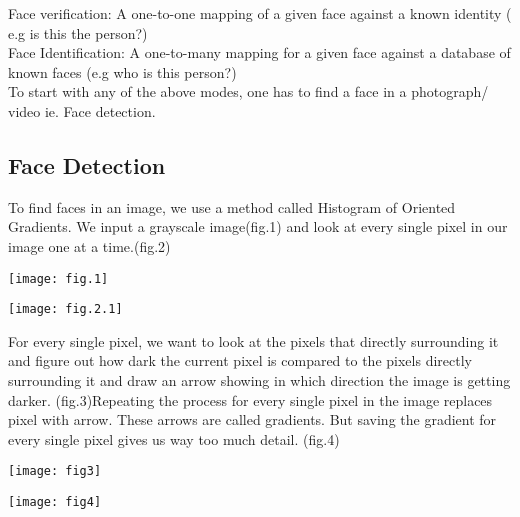 \documentclass[12pt]{report}
\begin{document}
Face verification:  A one-to-one mapping of a given face against a known identity ( e.g is this the person?)\\

Face Identification: A one-to-many mapping for a given face against a database of known faces (e.g who is this person?)\\

To start with any of the above modes, one has to find a face in a photograph/ video ie. Face detection.
\subsection{Face Detection}

To find faces in an image, we use a method called Histogram of Oriented Gradients. We input a grayscale image(fig.1) and look at every single pixel in our image one at a time.(fig.2) \\

\begin{center}
\begin{minipage}{0.49\linewidth}
\texttt{[image: fig.1]}
\end{minipage}%
\hfill
\begin{minipage}{0.49\linewidth}
\texttt{[image: fig.2.1]}
\end{minipage}
\end{center}

For every single pixel, we want to look at the pixels that directly surrounding it and figure out how dark the current pixel is compared to the pixels directly surrounding it and draw an arrow showing in which direction the image is getting darker. (fig.3)Repeating the process for every single pixel in the image replaces pixel with arrow. These arrows are called gradients. But saving the gradient for every single pixel gives us way too much detail. (fig.4)\\
\begin{center}
\begin{minipage}{0.49\linewidth}
\texttt{[image: fig3]}
\end{minipage}%
\hfill
\begin{minipage}{0.49\linewidth}
\texttt{[image: fig4]}
\end{minipage}
\end{center}
\end{document}
